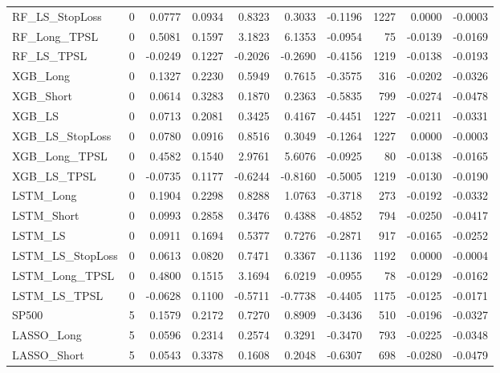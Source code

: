 \begin{tabular}{llrrrrrrrr}
\cline{1-10}
RF\_LS\_StopLoss & 0 & 0.0777 & 0.0934 & 0.8323 & 0.3033 & -0.1196 & 1227 & 0.0000 & -0.0003 \\
\cline{1-10}
RF\_Long\_TPSL & 0 & 0.5081 & 0.1597 & 3.1823 & 6.1353 & -0.0954 & 75 & -0.0139 & -0.0169 \\
\cline{1-10}
RF\_LS\_TPSL & 0 & -0.0249 & 0.1227 & -0.2026 & -0.2690 & -0.4156 & 1219 & -0.0138 & -0.0193 \\
\cline{1-10}
XGB\_Long & 0 & 0.1327 & 0.2230 & 0.5949 & 0.7615 & -0.3575 & 316 & -0.0202 & -0.0326 \\
\cline{1-10}
XGB\_Short & 0 & 0.0614 & 0.3283 & 0.1870 & 0.2363 & -0.5835 & 799 & -0.0274 & -0.0478 \\
\cline{1-10}
XGB\_LS & 0 & 0.0713 & 0.2081 & 0.3425 & 0.4167 & -0.4451 & 1227 & -0.0211 & -0.0331 \\
\cline{1-10}
XGB\_LS\_StopLoss & 0 & 0.0780 & 0.0916 & 0.8516 & 0.3049 & -0.1264 & 1227 & 0.0000 & -0.0003 \\
\cline{1-10}
XGB\_Long\_TPSL & 0 & 0.4582 & 0.1540 & 2.9761 & 5.6076 & -0.0925 & 80 & -0.0138 & -0.0165 \\
\cline{1-10}
XGB\_LS\_TPSL & 0 & -0.0735 & 0.1177 & -0.6244 & -0.8160 & -0.5005 & 1219 & -0.0130 & -0.0190 \\
\cline{1-10}
LSTM\_Long & 0 & 0.1904 & 0.2298 & 0.8288 & 1.0763 & -0.3718 & 273 & -0.0192 & -0.0332 \\
\cline{1-10}
LSTM\_Short & 0 & 0.0993 & 0.2858 & 0.3476 & 0.4388 & -0.4852 & 794 & -0.0250 & -0.0417 \\
\cline{1-10}
LSTM\_LS & 0 & 0.0911 & 0.1694 & 0.5377 & 0.7276 & -0.2871 & 917 & -0.0165 & -0.0252 \\
\cline{1-10}
LSTM\_LS\_StopLoss & 0 & 0.0613 & 0.0820 & 0.7471 & 0.3367 & -0.1136 & 1192 & 0.0000 & -0.0004 \\
\cline{1-10}
LSTM\_Long\_TPSL & 0 & 0.4800 & 0.1515 & 3.1694 & 6.0219 & -0.0955 & 78 & -0.0129 & -0.0162 \\
\cline{1-10}
LSTM\_LS\_TPSL & 0 & -0.0628 & 0.1100 & -0.5711 & -0.7738 & -0.4405 & 1175 & -0.0125 & -0.0171 \\
\cline{1-10}
SP500 & 5 & 0.1579 & 0.2172 & 0.7270 & 0.8909 & -0.3436 & 510 & -0.0196 & -0.0327 \\
\cline{1-10}
LASSO\_Long & 5 & 0.0596 & 0.2314 & 0.2574 & 0.3291 & -0.3470 & 793 & -0.0225 & -0.0348 \\
\cline{1-10}
LASSO\_Short & 5 & 0.0543 & 0.3378 & 0.1608 & 0.2048 & -0.6307 & 698 & -0.0280 & -0.0479 \\

\end{tabular}
